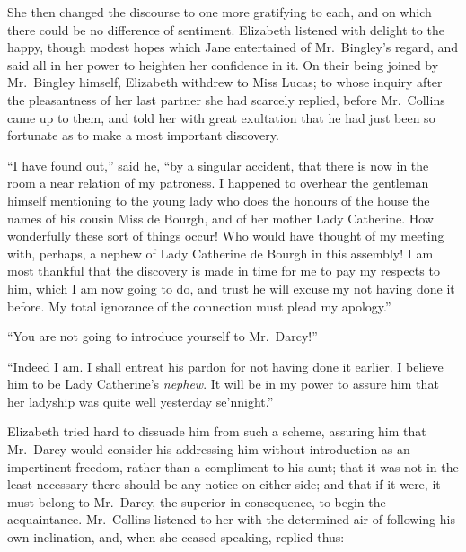 \documentclass[12pt,english]{book}
\begin{document}
She then changed the discourse to one more gratifying to each, and
on which there could be no difference of sentiment. Elizabeth listened
with delight to the happy, though modest hopes which Jane entertained
of Mr.\ Bingley's regard, and said all in her power to heighten her
confidence in it. On their being joined by Mr.\ Bingley himself,
Elizabeth withdrew to Miss Lucas; to whose inquiry after the pleasantness
of her last partner she had scarcely replied, before Mr.\ Collins
came up to them, and told her with great exultation that he had just
been so fortunate as to make a most important discovery.

{}``I have found out,'' said he, {}``by a singular accident, that
there is now in the room a near relation of my patroness. I happened
to overhear the gentleman himself mentioning to the young lady who
does the honours of the house the names of his cousin Miss de Bourgh,
and of her mother Lady Catherine. How wonderfully these sort of things
occur! Who would have thought of my meeting with, perhaps, a nephew
of Lady Catherine de Bourgh in this assembly! I am most thankful that
the discovery is made in time for me to pay my respects to him, which
I am now going to do, and trust he will excuse my not having done
it before. My total ignorance of the connection must plead my apology.''

{}``You are not going to introduce yourself to Mr.\ Darcy!''\


{}``Indeed I am. I shall entreat his pardon for not having done it
earlier. I believe him to be Lady Catherine's \textit{nephew}. It
will be in my power to assure him that her ladyship was quite well
yesterday se'nnight.''

Elizabeth tried hard to dissuade him from such a scheme, assuring
him that Mr.\ Darcy would consider his addressing him without introduction
as an impertinent freedom, rather than a compliment to his aunt; that
it was not in the least necessary there should be any notice on either
side; and that if it were, it must belong to Mr.\ Darcy, the superior
in consequence, to begin the acquaintance. Mr.\ Collins listened
to her with the determined air of following his own inclination, and,
when she ceased speaking, replied thus:
\end{document}
